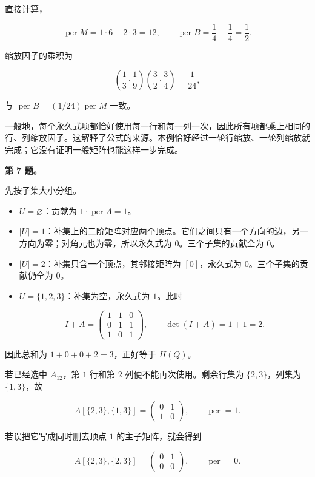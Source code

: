 \documentclass[11pt,a4paper]{article}
\begin{document}
直接计算，

\[\operatorname{per}M=1\cdot6+2\cdot3=12,\qquad
\operatorname{per}B=\frac14+\frac14=\frac12.\]

缩放因子的乘积为

\[\left(\frac13\cdot\frac19\right)
\left(\frac32\cdot\frac34\right)=\frac1{24},\]

与 \(\operatorname{per}B=(1/24)\operatorname{per}M\) 一致。

一般地，每个永久式项都恰好使用每一行和每一列一次，因此所有项都乘上相同的行、列缩放因子。这解释了公式的来源。本例恰好经过一轮行缩放、一轮列缩放就完成；它没有证明一般矩阵也能这样一步完成。

\textbf{第 7 题。}

先按子集大小分组。

\begin{itemize}
\item
  \(U=\varnothing\)：贡献为 \(1\cdot\operatorname{per}A=1\)。
\item
  \(|U|=1\)：补集上的二阶矩阵对应两个顶点。它们之间只有一个方向的边，另一方向为零；对角元也为零，所以永久式为 \(0\)。三个子集的贡献全为 \(0\)。
\item
  \(|U|=2\)：补集只含一个顶点，其邻接矩阵为 \([0]\)，永久式为 \(0\)。三个子集的贡献仍全为 \(0\)。
\item
  \(U=\{1,2,3\}\)：补集为空，永久式为 \(1\)。此时

  \[I+A=
  \begin{pmatrix}1&1&0\\0&1&1\\1&0&1\end{pmatrix},
  \qquad
  \det(I+A)=1+1=2.\]
\end{itemize}

因此总和为 \(1+0+0+2=3\)，正好等于 \(H(Q)\)。

若已经选中 \(A_{12}\)，第 \(1\) 行和第 \(2\) 列便不能再次使用。剩余行集为 \(\{2,3\}\)，列集为 \(\{1,3\}\)，故

\[A[\{2,3\},\{1,3\}]
=\begin{pmatrix}0&1\\1&0\end{pmatrix},
\qquad \operatorname{per}=1.\]

若误把它写成同时删去顶点 \(1\) 的主子矩阵，就会得到

\[A[\{2,3\},\{2,3\}]
=\begin{pmatrix}0&1\\0&0\end{pmatrix},
\qquad \operatorname{per}=0.\]
\end{document}
